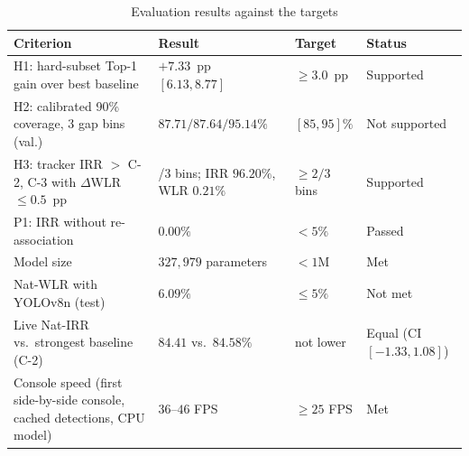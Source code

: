 \begin{table}[H]
    \centering
    \caption{Evaluation results against the targets}
    \label{tab:eval_vs_target}
    \small
    \begin{tabularx}{\textwidth}{>{\raggedright\arraybackslash}p{5.6cm} >{\raggedright\arraybackslash}X l l}
        \toprule
        \textbf{Criterion} & \textbf{Result} & \textbf{Target} & \textbf{Status} \\
        \midrule
        H1: hard-subset Top-1 gain over best baseline & $+7.33$~pp $[6.13, 8.77]$ & $\ge 3.0$~pp & Supported \\
        H2: calibrated 90\% coverage, 3 gap bins (val.) & $87.71 / 87.64 / 95.14\%$ & $[85, 95]\%$ & Not supported \\
        H3: tracker IRR $>$ C-2, C-3 with $\Delta$WLR $\le 0.5$~pp & 3/3 bins; IRR $96.20\%$, WLR $0.21\%$ & $\ge 2/3$ bins & Supported \\
        P1: IRR without re-association & $0.00\%$ & $< 5\%$ & Passed \\
        Model size & $327{,}979$ parameters & $< 1$M & Met \\
        Nat-WLR with YOLOv8n (test) & $6.09\%$ & $\le 5\%$ & Not met \\
        Live Nat-IRR vs.\ strongest baseline (C-2) & $84.41$ vs.\ $84.58\%$ & not lower & Equal (CI $[-1.33, 1.08]$) \\
        Console speed (first side-by-side console, cached detections, CPU model) & $36$--$46$ FPS & $\ge 25$ FPS & Met \\
        \bottomrule
    \end{tabularx}
\end{table}

